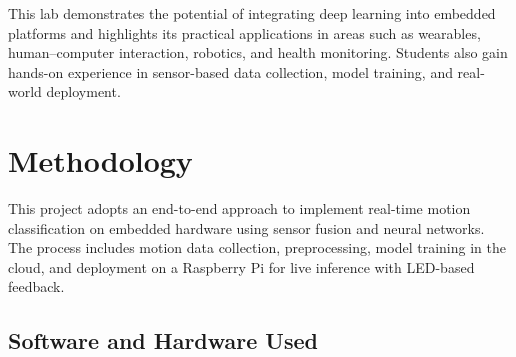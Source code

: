 \documentclass[a4paper,12pt]{article}
\begin{document}
This lab demonstrates the potential of integrating deep learning into embedded platforms and highlights its practical applications in areas such as wearables, human–computer interaction, robotics, and health monitoring. Students also gain hands-on experience in sensor-based data collection, model training, and real-world deployment.


\section{Methodology}

This project adopts an end-to-end approach to implement real-time motion classification on embedded hardware using sensor fusion and neural networks. The process includes motion data collection, preprocessing, model training in the cloud, and deployment on a Raspberry Pi for live inference with LED-based feedback.

\subsection{Software and Hardware Used}
\end{document}
